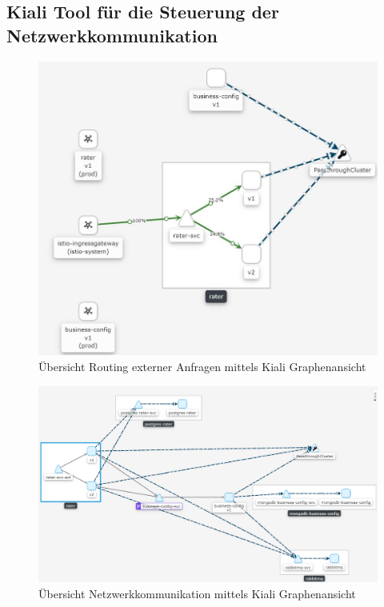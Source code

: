 \subsection{Kiali Tool für die Steuerung der Netzwerkkommunikation}
\begin{figure}[h]
	\begin{center}
		\includegraphics[width=16cm]{img/kiali_dashboard.JPG}
		\caption[Übersicht Routing externer Anfragen mittels Kiali Graphenansicht]{Übersicht Routing externer Anfragen mittels Kiali Graphenansicht}
		\label{anhang_kiali_dashboard}
	\end{center}
\end{figure}
\newpage
\begin{figure}[h]
	\begin{center}
		\includegraphics[width=16cm]{img/kiali_dashboard_2.PNG}
		\caption[Übersicht Netzwerkkommunikation mittels Kiali Graphenansicht]{Übersicht Netzwerkkommunikation mittels Kiali Graphenansicht}
		\label{anhang_kiali_dashboard}
	\end{center}
\end{figure}

